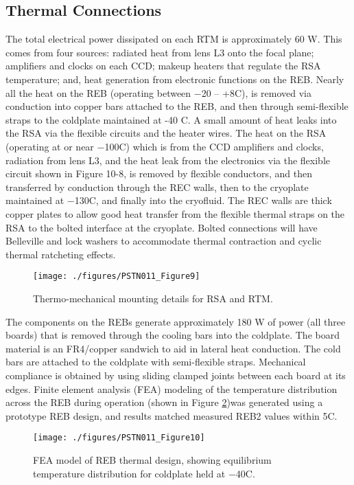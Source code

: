 \subsection{Thermal Connections}
The total electrical power dissipated on each RTM is approximately 60 W. This comes from four sources: radiated heat from lens L3 onto the focal plane; amplifiers and clocks on each CCD; makeup heaters that regulate the RSA temperature; and, heat generation from electronic functions on the REB.  Nearly all the heat on the REB (operating between 
$-$20 – +8\degsym C), is removed via conduction into copper bars attached to the REB, and then through semi-flexible straps to the coldplate maintained at -40 C. A small amount of heat leaks into the RSA via the flexible circuits and the heater wires. The heat on the RSA (operating at or near $-$100\degsym C) which is from the CCD amplifiers and clocks, radiation from lens L3, and the heat leak from the electronics via the flexible circuit shown in Figure 10-8, is removed by flexible conductors, and then transferred by conduction through the REC walls, then to the cryoplate maintained at $-$130\degsym C, and finally into the cryofluid.
The REC walls are thick copper plates to allow good heat transfer from the flexible thermal straps on the RSA to the bolted interface at the cryoplate. Bolted connections will have Belleville and lock washers to accommodate thermal contraction and cyclic thermal ratcheting effects.
 
\begin{figure}[htbp]
\begin{center}
\texttt{[image: ./figures/PSTN011\_Figure9]}
\caption{Thermo-mechanical mounting details for RSA and RTM.}
\label{fig:Fig9}
\end{center}
\end{figure}

The components on the REBs generate approximately 180 W of power (all three boards) that is removed through the cooling bars into the coldplate. The board material is an FR4/copper sandwich to aid in lateral heat conduction. The cold bars are attached to the coldplate with semi-flexible straps. Mechanical compliance is obtained by using sliding clamped joints between each board at its edges. 
Finite element analysis (FEA) modeling of the temperature distribution across the REB during operation (shown in Figure \ref{fig:Fig10})was generated using a prototype REB design, and results matched measured REB2 values within 5\degsym C. 
 
 \begin{figure}[htbp]
\begin{center}
\texttt{[image: ./figures/PSTN011\_Figure10]}
\caption{FEA model of REB thermal design, showing equilibrium temperature distribution for coldplate held at $-$40\degsym C.}
\label{fig:Fig10}
\end{center}
\end{figure}

